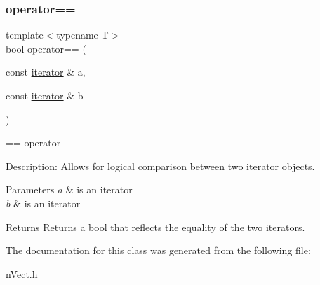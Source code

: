 \subsubsection{\texorpdfstring{operator==}{operator==}}
{\footnotesize\ttfamily template$<$typename T$>$ \\
bool operator== (\begin{DoxyParamCaption}\item[{const \hyperlink{classnVect_1_1iterator}{iterator} \&}]{a,  }\item[{const \hyperlink{classnVect_1_1iterator}{iterator} \&}]{b }\end{DoxyParamCaption})\hspace{0.3cm}{\ttfamily [friend]}}



== operator 

Description\+: Allows for logical comparison between two iterator objects. 
\begin{DoxyParams}{Parameters}
{\em a} & is an iterator \\
\hline
{\em b} & is an iterator \\
\hline
\end{DoxyParams}
\begin{DoxyReturn}{Returns}
Returns a bool that reflects the equality of the two iterators. 
\end{DoxyReturn}


The documentation for this class was generated from the following file\+:\begin{DoxyCompactItemize}
\item 
\hyperlink{nVect_8h}{n\+Vect.\+h}\end{DoxyCompactItemize}
